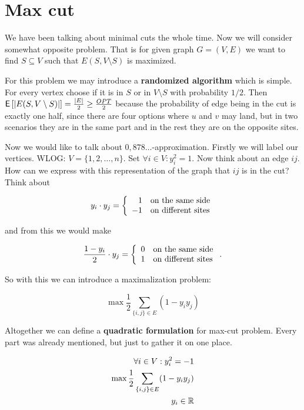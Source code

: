 \chapter{Max cut}

We have been talking about minimal cuts the whole time. Now we will consider somewhat opposite problem. That is for given graph $G = (V,E)$ we want to find $S \subseteq V$ such that $E(S, V \setminus S)$ is maximized.

For this problem we may introduce a \textbf{randomized algorithm} which is simple. For every vertex choose if it is in $S$ or in $V \setminus S$ with probability $1/2$. Then $\operatorname{\textsf{E}\,} [|E(S, V \setminus S)|] = \frac{|E|}{2} \geq \frac{OPT}{2}$ because the probability of edge being in the cut is exactly one half, since there are four options where $u$ and $v$ may land, but in two scenarios they are in the same part and in the rest they are on the opposite sites.

Now we would like to talk about $0,878\dots$-approximation. Firstly we will label our vertices. WLOG: $V = \{1, 2, \dots, n\}$. Set $\forall i \in V: y_{i}^2 =1$. Now think about an edge $ij$. How can we express with this representation of the graph that $ij$ is in the cut? Think about

$$
y_{i} \cdot y_{j} = \left\{
\begin{array}{r l}
	1 & \text{on the same side} \\
	-1 & \text{on different sites}
\end{array}
\right.
$$

and from this we would make

$$
\frac{1 - y_{i}}{2} \cdot y_{j} = \left\{
\begin{array}{r l}
	0 & \text{on the same side} \\
	1 & \text{on different sites}
\end{array}
\right..
$$

So with this we can introduce a maximalization problem:

$$
\max \frac{1}{2} \sum_{\{i,j\} \in E} (1 - y_i y_j)
$$

Altogether we can define a \textbf{quadratic formulation} for max-cut problem. Every part was already mentioned, but just to gather it on one place.

$$
\begin{aligned}
	\forall i \in V: y_{i}^2 = -1 \\
	\max \frac{1}{2} \sum_{\{i,j\} \in E} (1 - y_i y_j) \\
	y_{i} \in \mathbb{R}
\end{aligned}
$$

